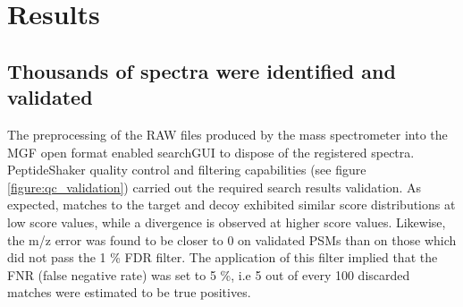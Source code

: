 \documentclass[11pt, a4paper]{report}
\begin{document}
\section{Results}

\subsection{Thousands of spectra were identified and validated}

The preprocessing of the RAW files produced by the mass spectrometer into the MGF open format enabled searchGUI to dispose of the registered spectra. PeptideShaker quality control and filtering capabilities (see figure \ref{figure:qc_validation}) carried out the required search results validation. As expected, matches to the target and decoy exhibited similar score distributions at low score values, while a divergence is observed at higher score values. Likewise, the m/z error was found to be closer to 0 on validated PSMs than on those which did not pass the 1 \% FDR filter. The application of this filter implied that the FNR (false negative rate) was set to 5 \%, i.e 5 out of every 100 discarded matches were estimated to be true positives.
\end{document}
